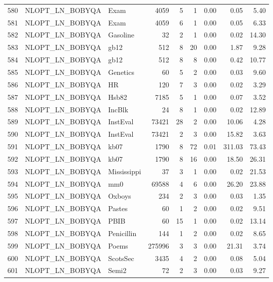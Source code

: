 \documentclass[article]{jss}
\begin{document}
\begin{table}[htbp]
\begin{tabular}{rllrrrrrr}
  580 & NLOPT\_LN\_BOBYQA & Exam & 4059 &   5 &   1 & 0.00 & 0.05 & 5.40 \\ 
  581 & NLOPT\_LN\_BOBYQA & Exam & 4059 &   6 &   1 & 0.00 & 0.05 & 6.33 \\ 
  582 & NLOPT\_LN\_BOBYQA & Gasoline &  32 &   2 &   1 & 0.00 & 0.02 & 14.30 \\ 
  583 & NLOPT\_LN\_BOBYQA & gb12 & 512 &   8 &  20 & 0.00 & 1.87 & 9.28 \\ 
  584 & NLOPT\_LN\_BOBYQA & gb12 & 512 &   8 &   8 & 0.00 & 0.42 & 10.77 \\ 
  585 & NLOPT\_LN\_BOBYQA & Genetics &  60 &   5 &   2 & 0.00 & 0.03 & 9.60 \\ 
  586 & NLOPT\_LN\_BOBYQA & HR & 120 &   7 &   3 & 0.00 & 0.02 & 3.29 \\ 
  587 & NLOPT\_LN\_BOBYQA & Hsb82 & 7185 &   5 &   1 & 0.00 & 0.07 & 3.52 \\ 
  588 & NLOPT\_LN\_BOBYQA & IncBlk &  24 &   8 &   1 & 0.00 & 0.02 & 12.89 \\ 
  589 & NLOPT\_LN\_BOBYQA & InstEval & 73421 &  28 &   2 & 0.00 & 10.06 & 4.28 \\ 
  590 & NLOPT\_LN\_BOBYQA & InstEval & 73421 &   2 &   3 & 0.00 & 15.82 & 3.63 \\ 
  591 & NLOPT\_LN\_BOBYQA & kb07 & 1790 &   8 &  72 & 0.01 & 311.03 & 73.43 \\ 
  592 & NLOPT\_LN\_BOBYQA & kb07 & 1790 &   8 &  16 & 0.00 & 18.50 & 26.31 \\ 
  593 & NLOPT\_LN\_BOBYQA & Mississippi &  37 &   3 &   1 & 0.00 & 0.02 & 21.53 \\ 
  594 & NLOPT\_LN\_BOBYQA & mm0 & 69588 &   4 &   6 & 0.00 & 26.20 & 23.88 \\ 
  595 & NLOPT\_LN\_BOBYQA & Oxboys & 234 &   2 &   3 & 0.00 & 0.03 & 1.35 \\ 
  596 & NLOPT\_LN\_BOBYQA & Pastes &  60 &   1 &   2 & 0.00 & 0.02 & 9.51 \\ 
  597 & NLOPT\_LN\_BOBYQA & PBIB &  60 &  15 &   1 & 0.00 & 0.02 & 13.14 \\ 
  598 & NLOPT\_LN\_BOBYQA & Penicillin & 144 &   1 &   2 & 0.00 & 0.02 & 8.65 \\ 
  599 & NLOPT\_LN\_BOBYQA & Poems & 275996 &   3 &   3 & 0.00 & 21.31 & 3.74 \\ 
  600 & NLOPT\_LN\_BOBYQA & ScotsSec & 3435 &   4 &   2 & 0.00 & 0.08 & 5.04 \\ 
  601 & NLOPT\_LN\_BOBYQA & Semi2 &  72 &   2 &   3 & 0.00 & 0.03 & 9.27 \\ 

\end{tabular}
\end{table}
\end{document}
